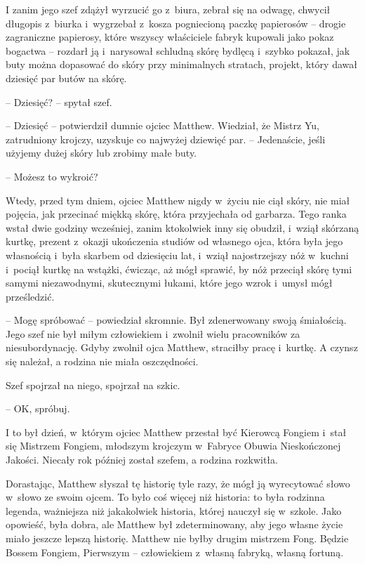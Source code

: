 \documentclass[oneside,polish,11pt,rmheadings]{mwbk}
\begin{document}
I zanim jego szef zdążył wyrzucić go z~biura, zebrał się na odwagę, chwycił długopis z~biurka i~wygrzebał z~kosza pogniecioną paczkę papierosów -- drogie zagraniczne papierosy, które wszyscy właściciele fabryk kupowali jako pokaz bogactwa -- rozdarł ją i~narysował schludną skórę bydlęcą i~szybko pokazał, jak buty można dopasować do skóry przy minimalnych stratach, projekt, który dawał dziesięć par butów na skórę. 


-- Dziesięć? -- spytał szef. 


-- Dziesięć -- potwierdził dumnie ojciec Matthew. Wiedział, że Mistrz Yu, zatrudniony krojczy, uzyskuje co najwyżej dziewięć par. -- Jedenaście, jeśli użyjemy dużej skóry lub zrobimy małe buty. 


-- Możesz to wykroić? 


Wtedy, przed tym dniem, ojciec Matthew nigdy w~życiu nie ciął skóry, nie miał pojęcia, jak przecinać miękką skórę, która przyjechała od garbarza. Tego ranka wstał dwie godziny wcześniej, zanim ktokolwiek inny się obudził, i~wziął skórzaną kurtkę, prezent z~okazji ukończenia studiów od własnego ojca, która była jego własnością i~była skarbem od dziesięciu lat, i~wziął najostrzejszy nóż w~kuchni i~pociął kurtkę na wstążki, ćwicząc, aż mógł sprawić, by nóż przeciął skórę tymi samymi niezawodnymi, skutecznymi łukami, które jego wzrok i~umysł mógł prześledzić. 


-- Mogę spróbować -- powiedział skromnie. Był zdenerwowany swoją śmiałością. Jego szef nie był miłym człowiekiem i~zwolnił wielu pracowników za niesubordynację. Gdyby zwolnił ojca Matthew, straciłby pracę i~kurtkę. A czynsz się należał, a rodzina nie miała oszczędności. 


Szef spojrzał na niego, spojrzał na szkic. 

-- OK, spróbuj. 


I to był dzień, w~którym ojciec Matthew przestał być Kierowcą Fongiem i~stał się Mistrzem Fongiem, młodszym krojczym w~Fabryce Obuwia Nieskończonej Jakości. Niecały rok później został szefem, a rodzina rozkwitła. 


Dorastając, Matthew słyszał tę historię tyle razy, że mógł ją wyrecytować słowo w~słowo ze swoim ojcem. To było coś więcej niż historia: to była rodzinna legenda, ważniejsza niż jakakolwiek historia, której nauczył się w~szkole. Jako opowieść, była dobra, ale Matthew był zdeterminowany, aby jego własne życie miało jeszcze lepszą historię. Matthew nie byłby drugim mistrzem Fong. Będzie Bossem Fongiem, Pierwszym -- człowiekiem z~własną fabryką, własną fortuną. 
\end{document}
